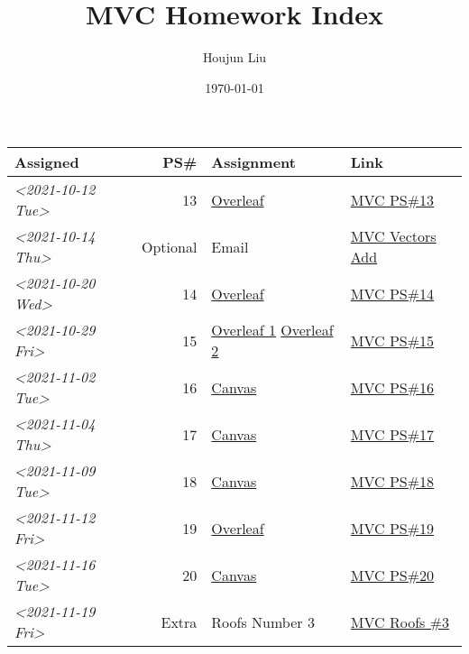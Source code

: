 \documentclass[letterpaper]{article}
\author{Houjun Liu}
\date{\today}
\title{MVC Homework Index}
\renewcommand{\tableofcontents}{}
\begin{document}
\tableofcontents

\begin{center}
\begin{tabular}{lrll}
Assigned & PS\# & Assignment & Link\\
\hline
\textit{<2021-10-12 Tue>} & 13 & \href{https://www.overleaf.com/read/xgvtnnmjmvqm}{Overleaf} & \href{../../../src/mathematics/multi_variable_calculus/KBhmvc_ps_13.org}{MVC PS\#13}\\
\textit{<2021-10-14 Thu>} & Optional & Email & \href{../../../src/mathematics/multi_variable_calculus/KBhmvc_vectors_add.org}{MVC Vectors Add}\\
\textit{<2021-10-20 Wed>} & 14 & \href{https://www.overleaf.com/project/616f7f9638ebe57edf35d158}{Overleaf} & \href{../../../src/mathematics/multi_variable_calculus/KBhmvc_ps_14.org}{MVC PS\#14}\\
\textit{<2021-10-29 Fri>} & 15 & \href{https://www.overleaf.com/project/6106d6de391bc17a582564ee}{Overleaf 1} \href{https://www.overleaf.com/project/61105f0407d007694107563c}{Overleaf 2} & \href{../../../src/mathematics/multi_variable_calculus/KBhmvc_ps_15.org}{MVC PS\#15}\\
\textit{<2021-11-02 Tue>} & 16 & \href{https://nuevaschool.instructure.com/courses/3834/assignments/64213}{Canvas} & \href{../../../src/mathematics/multi_variable_calculus/KBhmvc_ps_16.org}{MVC PS\#16}\\
\textit{<2021-11-04 Thu>} & 17 & \href{https://nuevaschool.instructure.com/courses/3834/assignments/64357}{Canvas} & \href{../../../src/mathematics/multi_variable_calculus/KBhmvc_ps_17.org}{MVC PS\#17}\\
\textit{<2021-11-09 Tue>} & 18 & \href{https://nuevaschool.instructure.com/courses/3834/assignments/64549}{Canvas} & \href{../../../src/mathematics/multi_variable_calculus/KBhmvc_ps_18.org}{MVC PS\#18}\\
\textit{<2021-11-12 Fri>} & 19 & \href{https://www.overleaf.com/project/618e9d8568ca868580a1c2bb}{Overleaf} & \href{../../../src/mathematics/multi_variable_calculus/KBhmvc_ps_19.org}{MVC PS\#19}\\
\textit{<2021-11-16 Tue>} & 20 & \href{https://nuevaschool.instructure.com/courses/3834/assignments/64856}{Canvas} & \href{../../../src/mathematics/multi_variable_calculus/KBhmvc_ps_20.org}{MVC PS\#20}\\
\textit{<2021-11-19 Fri>} & Extra & Roofs Number 3 & \href{../../../src/mathematics/multi_variable_calculus/KBhmvc_roofs_3.org}{MVC Roofs \#3}\\

\end{tabular}
\end{center}
\end{document}
